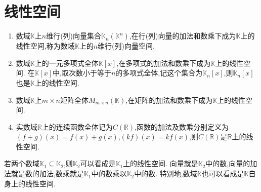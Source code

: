 \documentclass[../../main.tex]{subfiles}
\begin{document}
\section{线性空间}

\begin{example}[$\,\,$常见的线性空间]\label{example:常见的线性空间}
\begin{enumerate}[(1)]
\item 数域\(\mathbb{K}\)上\(n\)维行(列)向量集合\(\mathbb{K}_n(\mathbb{K}^n)\),在行(列)向量的加法和数乘下成为\(\mathbb{K}\)上的线性空间,称为数域\(\mathbb{K}\)上的\(n\)维行(列)向量空间.
\item 数域\(\mathbb{K}\)上的一元多项式全体\(\mathbb{K}[x]\),在多项式的加法和数乘下成为\(\mathbb{K}\)上的线性空间. 在\(\mathbb{K}[x]\)中,取次数小于等于\(n\)的多项式全体,记这个集合为\(\mathbb{K}_n[x]\),则\(\mathbb{K}_n[x]\)也是\(\mathbb{K}\)上的线性空间.
\item 数域\(\mathbb{K}\)上\(m\times n\)矩阵全体\(M_{m\times n}(\mathbb{K})\),在矩阵的加法和数乘下成为\(\mathbb{K}\)上的线性空间.
\item \label{example:常见的线性空间(4)}实数域\(\mathbb{R}\)上的连续函数全体记为\(C(\mathbb{R})\),函数的加法及数乘分别定义为\((f + g)(x)=f(x)+g(x)\),\((kf)(x)=kf(x)\),则\(C(\mathbb{R})\)是\(\mathbb{R}\)上的线性空间.
\end{enumerate}
\end{example}

\begin{proposition}\label{proposition:数域上的线性空间}
若两个数域\(\mathbb{K}_1\subseteq\mathbb{K}_2\),则\(\mathbb{K}_2\)可以看成是\(\mathbb{K}_1\)上的线性空间. 向量就是\(\mathbb{K}_2\)中的数,向量的加法就是数的加法,数乘就是\(\mathbb{K}_1\)中的数乘以\(\mathbb{K}_2\)中的数. 特别地,数域\(\mathbb{K}\)也可以看成是\(\mathbb{K}\)自身上的线性空间.
\end{proposition}
\end{document}
